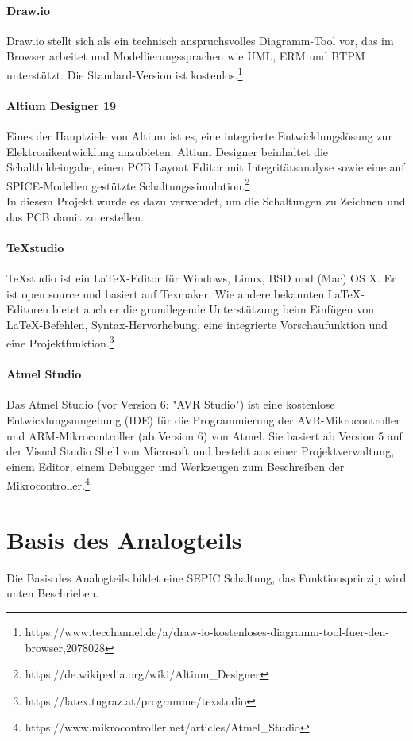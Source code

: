 \documentclass[paper=a4, 12pt]{scrreprt}
\begin{document}
	\paragraph{Draw.io}\hfill \break
	Draw.io stellt sich als ein technisch anspruchsvolles Diagramm-Tool vor, das im Browser arbeitet und Modellierungssprachen wie UML, ERM und BTPM unterstützt. Die Standard-Version ist kostenlos.\footnote{https://www.tecchannel.de/a/draw-io-kostenloses-diagramm-tool-fuer-den-browser,2078028}
	\paragraph{Altium Designer 19}\hfill \break
	Eines der Hauptziele von Altium ist es, eine integrierte Entwicklungslösung zur Elektronikentwicklung anzubieten.
	Altium Designer beinhaltet die Schaltbildeingabe, einen PCB Layout Editor mit Integritätsanalyse sowie eine auf SPICE-Modellen gestützte Schaltungssimulation.\footnote{https://de.wikipedia.org/wiki/Altium\_Designer}\\
	In diesem Projekt wurde es dazu verwendet, um die Schaltungen zu Zeichnen und das PCB damit zu erstellen.
	\paragraph{TeXstudio}\hfill \break
	TeXstudio ist ein LaTeX-Editor für Windows, Linux, BSD und (Mac) OS X. Er ist open source und basiert auf Texmaker. Wie andere bekannten LaTeX-Editoren bietet auch er die grundlegende Unterstützung beim Einfügen von LaTeX-Befehlen, Syntax-Hervorhebung, eine integrierte Vorschaufunktion und eine Projektfunktion.\footnote{https://latex.tugraz.at/programme/texstudio}
	\paragraph{Atmel Studio}\hfill \break
	Das Atmel Studio (vor Version 6: "AVR Studio") ist eine kostenlose Entwicklungsumgebung (IDE) für die Programmierung der AVR-Mikrocontroller und ARM-Mikrocontroller (ab Version 6) von Atmel. Sie basiert ab Version 5 auf der Visual Studio Shell von Microsoft und besteht aus einer Projektverwaltung, einem Editor, einem Debugger und Werkzeugen zum Beschreiben der Mikrocontroller.\footnote{https://www.mikrocontroller.net/articles/Atmel\_Studio}
	\newpage
	
	\section{Basis des Analogteils}
	Die Basis des Analogteils bildet eine SEPIC Schaltung, das Funktionsprinzip wird unten Beschrieben.
\end{document}
